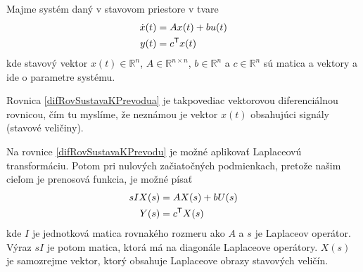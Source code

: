 \documentclass[a4paper, 10pt, ]{article}
\begin{document}
Majme systém daný v stavovom priestore v tvare
\begin{subequations} \label{difRovSustavaKPrevodu}
    \begin{align} 
        \dot x(t) &= A x(t) + b u(t) \label{difRovSustavaKPrevodua}\\
        y(t) &= c^{\mathsf{T}} x(t) 
    \end{align}
\end{subequations}
kde stavový vektor $x(t) \in \mathbb R^n$, $A \in \mathbb R^{n \times n}$, $b \in \mathbb R^n$ a $c \in \mathbb R^n$ sú matica a vektory a ide o parametre systému. 

Rovnica \eqref{difRovSustavaKPrevodua} je takpovediac vektorovou diferenciálnou rovnicou, čím tu myslíme, že neznámou je vektor $x(t)$ obsahujúci signály (stavové veličiny).

Na rovnice \eqref{difRovSustavaKPrevodu} je možné aplikovať Laplaceovú transformáciu. Potom pri nulových začiatočných podmienkach, pretože našim cieľom je prenosová funkcia, je možné písať
\begin{subequations}
    \begin{align}
        s I X(s) &= A X(s) + b U(s) \label{SRovSustavaKPrevodua} \\
        Y(s) &= c^{\mathsf{T}} X(s) \label{SRovSustavaKPrevodub}
    \end{align}
\end{subequations}
kde $I$ je jednotková matica rovnakého rozmeru ako $A$ a $s$ je Laplaceov operátor. Výraz $s I$ je potom matica, ktorá má na diagonále Laplaceove operátory. $X(s)$ je samozrejme vektor, ktorý obsahuje Laplaceove obrazy stavových veličín.
\end{document}
